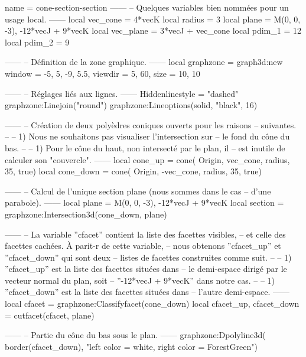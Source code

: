 \documentclass[border = 3pt]{standalone}
\begin{document}
\begin{luadraw}{name = cone-section-section}
------
-- Quelques variables bien nommées pour un usage local.
------
    local vec_cone  = 4*vecK
    local radius    = 3
    local plane     = {M(0, 0, -3), -12*vecJ + 9*vecK}
    local vec_plane = 3*vecJ + vec_cone
    local pdim_1    = 12
    local pdim_2    = 9

------
-- Définition de la zone graphique.
------
    local graphzone = graph3d:new{
        window  = {-5, 5, -9, 5.5},
        viewdir = {5, 60},
        size    = {10, 10}
    }

------
-- Réglages liés aux lignes.
------
    Hiddenlinestyle = "dashed"
    graphzone:Linejoin("round")
    graphzone:Lineoptions(solid, "black", 16)

------
-- Création de deux polyèdres coniques ouverts pour les raisons
-- suivantes.
--
--     1) Nous ne souhaitons pas visualiser l'intersection sur
--     le fond du cône du bas.
--
--     1) Pour le cône du haut, non intersecté par le plan, il
--     est inutile de calculer son "couvercle".
------
    local cone_up = cone(
        Origin, vec_cone, radius,
        35,
        true)
    local cone_down = cone(
        Origin, -vec_cone, radius,
        35,
        true)

------
-- Calcul de l'unique section plane (nous sommes dans le cas
-- d'une parabole).
------
    local plane   = {M(0, 0, -3), -12*vecJ + 9*vecK}
    local section = graphzone:Intersection3d(cone_down, plane)

------
-- La variable ''cfacet'' contient la liste des facettes visibles,
-- et celle des facettes cachées. À parit-r de cette variable,
-- nous obtenons ''cfacet_up'' et ''cfacet_down'' qui sont deux
-- listes de facettes construites comme suit.
--
--     1) ''cfacet_up'' est la liste des facettes situées dans
--     le demi-espace dirigé par le vecteur normal du plan, soit
--     ''-12*vecJ + 9*vecK'' dans notre cas.
--
--     1) ''cfacet_down'' est la liste des facettes situées dans
--     l’autre demi-espace.
------
    local cfacet                 = graphzone:Classifyfacet(cone_down)
    local cfacet_up, cfacet_down = cutfacet(cfacet, plane)

------
-- Partie du cône du bas sous le plan.
------
    graphzone:Dpolyline3d(
        border(cfacet_down),
        "left color = white, right color = ForestGreen")


\end{luadraw}
\end{document}
